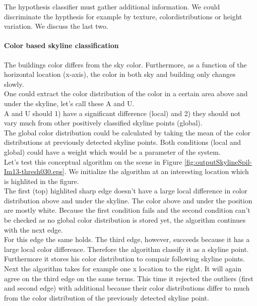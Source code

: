 The hypothesis classifier must gather additional information. We could
discriminate the hypthesis for example by texture, colordistributions or height
variation. We discuss the last two.

\paragraph{Color based skyline classification}
The buildings color differs from the sky color. Furthermore,
as a function of the horizontal location (x-axis), the color in both sky and
building only changes slowly.\\

One could extract the color distribution of the color in a certain area above
and under the skyline, let's call these A and U. \\
A and U should 1) have a significant difference (local) and 2) they should not vary much from 
other positively classified skyline points (global).\\

The global color distribution could be calculated by taking the mean of the
color distributions at previously detected skyline points.  Both conditions
(local and global) could have a weight which would be a parameter of the
system.\\

Let's test this conceptual algorithm on the scene in Figure
\ref{fig:outputSkylineSpil-Im13-thresh030.eps}.  We initialize the algorithm at
an interesting location which is highlited in the figure.\\
The first (top) highlited sharp edge doesn't have a large local difference in color distribution
above and under the skyline. The color above and under the position are mostly
white. Because the first condition fails and the second condition can't be
checked as no global color distribution is stored yet, the algorithm continues
with the next edge.\\
For this edge the same holds.
The third edge, however, succeeds because it has a large local color difference.
Therefore the algorithm classify it as a skyline point.
Furthermore it stores his color distribution to compair following skyline points.
Next the algorithm takes for example one x
location to the right.  It will again agree on the third edge on the same terms.
This time it rejected the outliers (first and second edge) with additional
because their color distributions differ to much from the color
distribution of the previously detected skyline point.\\

